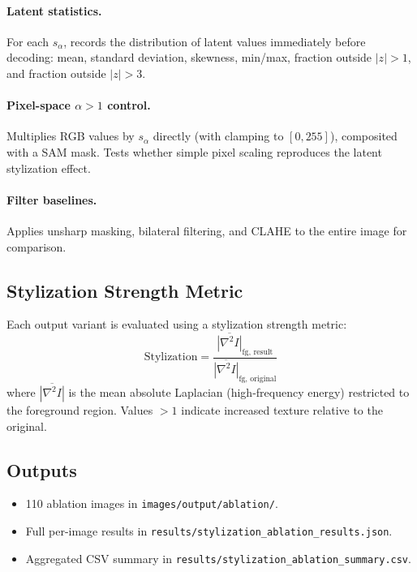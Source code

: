 \documentclass[11pt,a4paper]{article}
\begin{document}
\paragraph{Latent statistics.}
For each $s_\alpha$, records the distribution of latent values immediately before decoding: mean, standard deviation, skewness, min/max, fraction outside $|z| > 1$, and fraction outside $|z| > 3$.

\paragraph{Pixel-space $\alpha > 1$ control.}
Multiplies RGB values by $s_\alpha$ directly (with clamping to $[0, 255]$), composited with a SAM mask. Tests whether simple pixel scaling reproduces the latent stylization effect.

\paragraph{Filter baselines.}
Applies unsharp masking, bilateral filtering, and CLAHE to the entire image for comparison.

\subsection{Stylization Strength Metric}

Each output variant is evaluated using a stylization strength metric:
\begin{equation}
  \text{Stylization} = \frac{\overline{|\nabla^2 I|}_{\text{fg, result}}}{\overline{|\nabla^2 I|}_{\text{fg, original}}}
\end{equation}
where $\overline{|\nabla^2 I|}$ is the mean absolute Laplacian (high-frequency energy) restricted to the foreground region. Values $> 1$ indicate increased texture relative to the original.

\subsection{Outputs}

\begin{itemize}
  \item 110 ablation images in \texttt{images/output/ablation/}.
  \item Full per-image results in \texttt{results/stylization\_ablation\_results.json}.
  \item Aggregated CSV summary in \texttt{results/stylization\_ablation\_summary.csv}.
\end{itemize}
\end{document}
